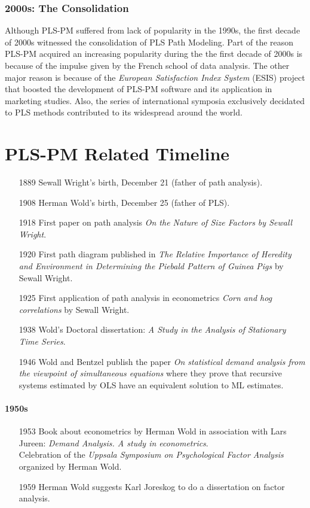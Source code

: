 \documentclass[12pt]{book}\usepackage{graphicx, color}
\begin{document}
\subsubsection*{2000s: The Consolidation}
Although PLS-PM suffered from lack of popularity in the 1990s, the first decade of 2000s witnessed the consolidation of PLS Path Modeling. Part of the reason PLS-PM acquired an increasing popularity during the the first decade of 2000s is because of the impulse given by the French school of data analysis. The other major reason is because of the \textit{European Satisfaction Index System} (ESIS) project that boosted the development of PLS-PM software and its application in marketing studies. Also, the series of international symposia exclusively decidated to PLS methods
contributed to its widespread around the world. 



\section{PLS-PM Related Timeline}
\begin{enumerate}
 \item[1889] Sewall Wright's birth, December 21 (father of path analysis).
 \item[1908] Herman Wold's birth, December 25 (father of PLS).
 \item[1918] First paper on path analysis \textit{On the Nature of Size Factors by Sewall Wright}.
 \item[1920] First path diagram published in \textit{The Relative Importance of Heredity and Environment in Determining the Piebald Pattern of Guinea Pigs} by Sewall Wright.
 \item[1925] First application of path analysis in econometrics \textit{Corn and hog correlations} by Sewall Wright.
 \item[1938] Wold's Doctoral dissertation: \textit{A Study in the Analysis of Stationary Time Series}.
 \item[1946] Wold and Bentzel publish the paper \textit{On statistical demand analysis from the viewpoint of simultaneous equations} where they prove that recursive systems estimated by OLS have an equivalent solution to ML estimates.
\end{enumerate}

\paragraph{1950s}
\begin{enumerate}
 \item[1953] Book about econometrics by Herman Wold in association with Lars Jureen: \textit{Demand Analysis. A study in econometrics}. \\
Celebration of the \textit{Uppsala Symposium on Psychological Factor Analysis} organized by Herman Wold.
 \item[1959] Herman Wold suggests Karl Joreskog to do a dissertation on factor analysis.
\end{enumerate}
\end{document}
